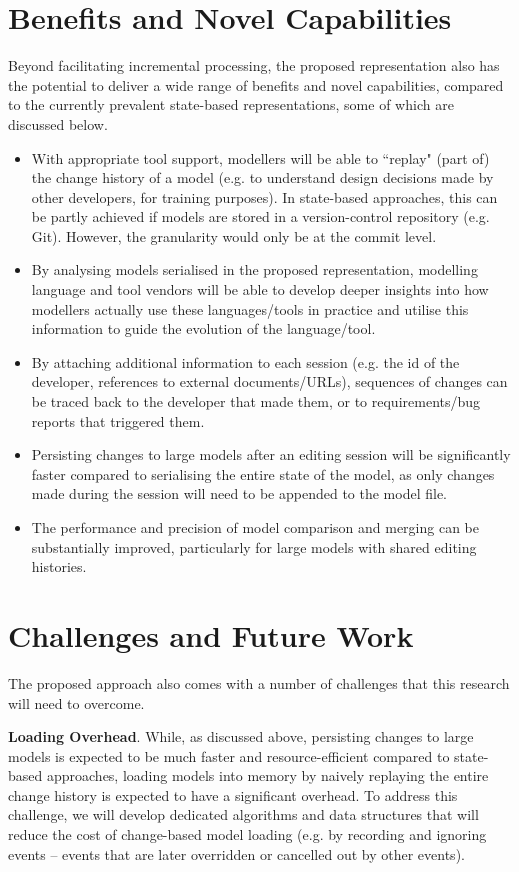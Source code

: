 \documentclass{llncs}
\begin{document}
\section{Benefits and Novel Capabilities}
\label{Benefits and Novel Capabilities}
Beyond facilitating incremental processing, the proposed representation also has the potential to deliver a wide range of benefits and novel capabilities, compared to the currently prevalent state-based representations, some of which are discussed below.

\begin{itemize}
\item With appropriate tool support, modellers will be able to ``replay" (part of) the change history of a model (e.g. to understand design decisions made by other developers, for training purposes). In state-based approaches, this can be partly achieved if models are stored in a version-control repository (e.g. Git). However, the granularity would only be at the commit level.
\item By analysing models serialised in the proposed representation, modelling language and tool vendors will be able to develop deeper insights into how modellers actually use these languages/tools in practice and utilise this information to guide the evolution of the language/tool.
\item By attaching additional information to each session (e.g. the id of the developer, references to external documents/URLs), sequences of changes can be traced back to the developer that made them, or to requirements/bug reports that triggered them.
\item Persisting changes to large models after an editing session will be significantly faster compared to serialising the entire state of the model, as only changes made during the session will need to be appended to the model file.
\item The performance and precision of model comparison and merging can be substantially improved, particularly for large models with shared editing histories.
\end{itemize}

\section{Challenges and Future Work}
\label{Challenges and Future Works}
The proposed approach also comes with a number of challenges that this research will need to overcome.

\textbf{Loading Overhead}. While, as discussed above, persisting changes to large models is expected to be much faster and resource-efficient compared to state-based approaches, loading models into memory by naively replaying the entire change history is expected to have a significant overhead. To address this challenge, we will develop dedicated algorithms and data structures that will reduce the cost of change-based model loading (e.g. by recording and ignoring events -- events that are later overridden or cancelled out by other events). 
\end{document}
